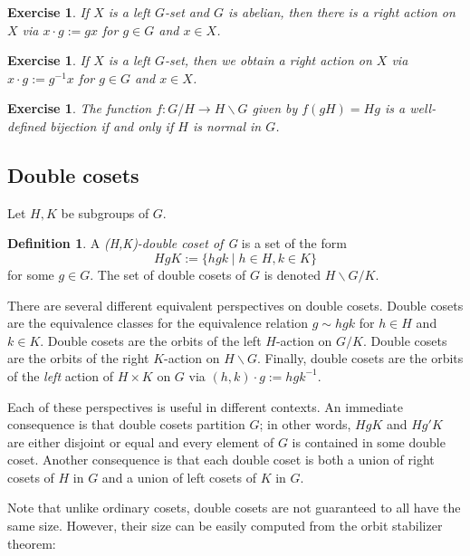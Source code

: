 \documentclass[12pt]{article}
\theoremstyle{plain}
\newtheorem{exercise}[theorem]{Exercise}
\theoremstyle{definition}
\newtheorem{definition}[theorem]{Definition}
\theoremstyle{remark}
\numberwithin{equation}{section}
\begin{document}
\begin{exercise}
If $X$ is a \emph{left} $G$-set and $G$ is abelian, then there is a
\emph{right} action on $X$ via $x \cdot g := gx$ for $g \in G$ and $x \in X$.
\end{exercise}

\begin{exercise}
If $X$ is a \emph{left} $G$-set, then we obtain a \emph{right}
action on $X$ via $x \cdot g := g^{-1}x$ for $g \in G$ and $x \in X$.
\end{exercise}

\begin{exercise}
The function $f : G/H \to H\backslash G$ given by $f(gH)=Hg$ is a
well-defined bijection if and only if $H$ is normal in $G$.
\end{exercise}

\subsection{Double cosets}

Let $H, K$ be subgroups of $G$.

\begin{definition}
A \emph{(H,K)-double coset of G} is a set of the form
\[
HgK := \{ hgk \mid h \in H, k \in K \}
\]
for some $g \in G$.
The set of double cosets of $G$ is denoted
$H \backslash G / K$.
\end{definition}

There are several different equivalent perspectives on double cosets.
Double cosets are the equivalence classes for the equivalence relation
$g \sim hgk$ for $h \in H$ and $k \in K$.
Double cosets are the orbits of the left $H$-action on $G/K$.
Double cosets are the orbits of the right $K$-action on $H\backslash G$.
Finally, double cosets are the orbits of the \emph{left} action
of $H \times K$ on $G$ via $(h,k)\cdot g := hgk^{-1}$.

Each of these perspectives is useful in different contexts.
An immediate consequence is that double cosets partition $G$;
in other words, $HgK$ and $Hg'K$ are either disjoint or equal
and every element of $G$ is contained in some double coset.
Another consequence is that each double coset is both a union of
right cosets of $H$ in $G$ and a union of left cosets of $K$ in $G$.

Note that unlike ordinary cosets, double cosets are not guaranteed to
all have the same size.  However, their size can be easily computed
from the orbit stabilizer theorem:
\end{document}
